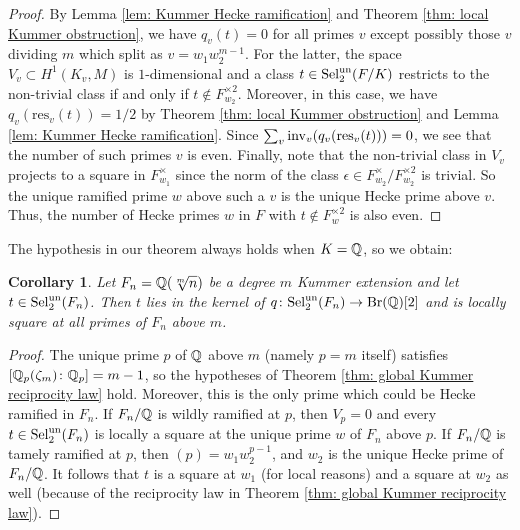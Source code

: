 \documentclass[11pt,a4paper]{amsart}
\def\Q{{\rm \mathbb{Q}}}
\def\un{{\rm un}}
\def\inv{{\rm inv}}
\def\Br{{\rm Br}}
\def\Sel{{\rm Sel}}
\numberwithin{equation}{section}
\newtheorem{corollary}[theorem]{Corollary}
\begin{document}
\begin{proof}
By Lemma \ref{lem: Kummer Hecke ramification} and Theorem \ref{thm: local Kummer obstruction},  we have $q_v(t) = 0$ for all primes $v$ except possibly those $v$ dividing $m$ which split as $v = w_1w_2^{m-1}$. For the latter, the space $V_v \subset H^1(K_v, M)$ is $1$-dimensional and a class $t \in \Sel_2^\un(F/K)$ restricts to the non-trivial class if and only if $t \notin F_{w_2}^{\times 2}$. Moreover, in this case, we have $q_v(\mathrm{res}_v(t)) = 1/2$ by Theorem \ref{thm: local Kummer obstruction} and Lemma \ref{lem: Kummer Hecke ramification}. Since $\sum_v \inv_v(q_v(\mathrm{res}_v(t))) = 0$, we see that the number of such primes $v$ is even. Finally, note that the non-trivial class in $V_v$ projects to a square in $F_{w_1}^\times$ since the norm of the class $\epsilon \in F_{w_2}^\times/F^{\times 2}_{w_2}$ is trivial. So the unique ramified prime $w$ above such a $v$ is the unique Hecke prime above $v$. Thus, the number of Hecke primes $w$ in $F$ with $t \notin F_w^{\times 2}$ is also even.   
\end{proof}

The hypothesis in our theorem always holds when $K = \Q$, so we obtain:

\begin{corollary}\label{thm: reciprocity for Kummer extensions over Q}
    Let $F_n = \Q(\sqrt[m]{n})$ be a degree $m$ Kummer extension and let $t \in \Sel_2^\un(F_n)$. Then $t$ lies in the kernel of $q \colon \Sel_2^\un(F_n) \to \Br(\Q)[2]$ and is locally square at all primes of $F_n$ above $m$. 
\end{corollary}
\begin{proof}
    The unique prime $p$ of $\Q$ above $m$ (namely $p = m$ itself) satisfies $[\Q_p(\zeta_m) \colon \Q_p] = m-1$, so the hypotheses of Theorem \ref{thm: global Kummer reciprocity law} hold. Moreover, this is the only prime which could be Hecke ramified in $F_n$. If $F_n/\Q$ is wildly ramified at $p$, then $V_p = 0$ and every $t \in \Sel_2^\un(F_n)$ is locally a square at the unique prime $w$ of $F_n$ above $p$. If $F_n/\Q$ is tamely ramified at $p$, then $(p) = w_1 w_2^{p-1}$, and $w_2$ is the unique Hecke prime of $F_n/\Q$. It follows that $t$ is a square at $w_1$ (for local reasons) and a square at $w_2$ as well (because of the reciprocity law in Theorem \ref{thm: global Kummer reciprocity law}).  
\end{proof}
\end{document}
